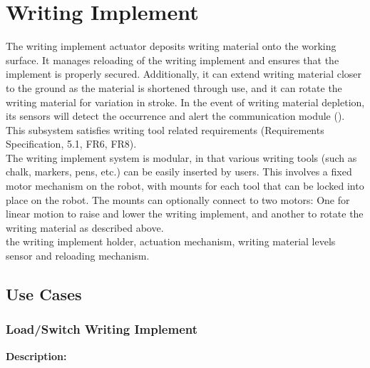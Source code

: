 
\section{Writing Implement}
\label{sec:writing_implement}
The writing implement actuator deposits writing material onto the working surface. It manages reloading of the writing implement and ensures that the implement is properly secured. Additionally, it can extend writing material closer to the ground as the material is shortened through use, and it can rotate the writing material for variation in stroke. In the event of writing material depletion, its sensors will detect the occurrence and alert the communication module (). This subsystem satisfies writing tool related requirements (Requirements Specification, 5.1, FR6, FR8). \\
The writing implement system is modular, in that various writing tools (such as chalk, markers, pens, etc.) can be easily inserted by users. This involves a fixed motor mechanism on the robot, with mounts for each tool that can be locked into place on the robot. The mounts can optionally connect to two motors: One for linear motion to raise and lower the writing implement, and another to rotate the writing material as described above. \\

 the writing implement holder, actuation mechanism, writing material levels sensor and reloading mechanism. \\


\subsection{Use Cases}

\subsubsection{Load/Switch Writing Implement}
\textbf{Description:} 

